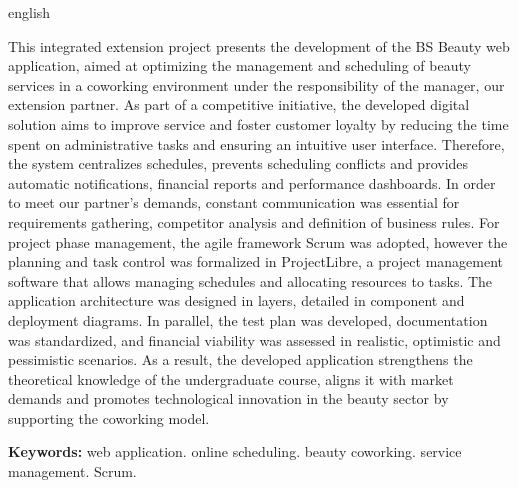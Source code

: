 	\begin{resumo}[ABSTRACT]
	\begin{otherlanguage*}{english}
		
		This integrated extension project presents the development of the BS Beauty web application, aimed at optimizing the management and scheduling of beauty services in a coworking environment under the responsibility of the manager, our extension partner. As part of a competitive initiative, the developed digital solution aims to improve service and foster customer loyalty by reducing the time spent on administrative tasks and ensuring an intuitive user interface. Therefore, the system centralizes schedules, prevents scheduling conflicts and provides automatic notifications, financial reports and performance dashboards. In order to meet our partner’s demands, constant communication was essential for requirements gathering, competitor analysis and definition of business rules. For project phase management, the agile framework Scrum was adopted, however the planning and task control was formalized in ProjectLibre, a project management software that allows managing schedules and allocating resources to tasks. The application architecture was designed in layers, detailed in component and deployment diagrams. In parallel, the test plan was developed, documentation was standardized, and financial viability was assessed in realistic, optimistic and pessimistic scenarios. As a result, the developed application strengthens the theoretical knowledge of the undergraduate course, aligns it with market demands and promotes technological innovation in the beauty sector by supporting the coworking model.
		
		\textbf{Keywords:} web application. online scheduling. beauty coworking. service management. Scrum.
		
	\end{otherlanguage*}
\end{resumo}